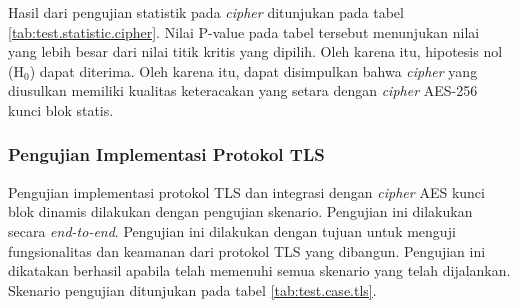 Hasil dari pengujian statistik pada \emph{cipher} ditunjukan pada tabel \ref{tab:test.statistic.cipher}. Nilai P-value pada tabel tersebut menunjukan nilai yang lebih besar dari nilai titik kritis yang dipilih. Oleh karena itu, hipotesis nol ($\text{H}_0$) dapat diterima. Oleh karena itu, dapat disimpulkan bahwa \emph{cipher} yang diusulkan memiliki kualitas keteracakan yang setara dengan \emph{cipher} AES-256 kunci blok statis.

\subsubsection{Pengujian Implementasi Protokol TLS}

Pengujian implementasi protokol TLS dan integrasi dengan \emph{cipher} AES kunci blok dinamis dilakukan dengan pengujian skenario. Pengujian ini dilakukan secara \emph{end-to-end}. Pengujian ini dilakukan dengan tujuan untuk menguji fungsionalitas dan keamanan dari protokol TLS yang dibangun. Pengujian ini dikatakan berhasil apabila telah memenuhi semua skenario yang telah dijalankan. Skenario pengujian ditunjukan pada tabel \ref{tab:test.case.tls}.

